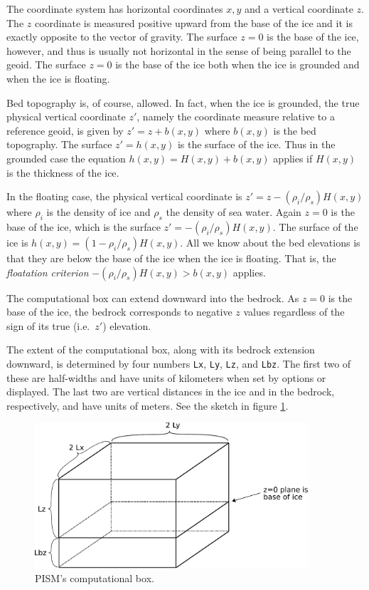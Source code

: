 \documentclass[11pt,final]{amsart}
\renewcommand{\t}[1]{\texttt{#1}}
\begin{document}
The coordinate system has horizontal coordinates $x,y$ and a vertical coordinate $z$.  The $z$ coordinate is measured positive upward from the base of the ice and it is exactly opposite to the vector of gravity.  The surface $z=0$ is the base of the ice, however, and thus is usually not horizontal in the sense of being parallel to the geoid.   The surface $z=0$ is the base of the ice both when the ice is grounded and when the ice is floating.

Bed topography is, of course, allowed.  In fact, when the ice is grounded, the true physical vertical coordinate $z'$, namely the coordinate measure relative to a reference geoid, is given by $z'=z+b(x,y)$ where $b(x,y)$ is the bed topography.  The surface $z'=h(x,y)$ is the surface of the ice.  Thus in the grounded case the equation $h(x,y)=H(x,y)+b(x,y)$ applies if $H(x,y)$ is the thickness of the ice.

In the floating case, the physical vertical coordinate is $z'=z-(\rho_i/\rho_s) H(x,y)$ where $\rho_i$ is the density of ice and $\rho_s$ the density of sea water.  Again $z=0$ is the base of the ice, which is the surface $z' = -(\rho_i/\rho_s) H(x,y)$.  The surface of the ice is $h(x,y) = (1-\rho_i/\rho_s) H(x,y)$.  All we know about the bed elevations is that they are below the base of the ice when the ice is floating.  That is, the \emph{floatation criterion} $-(\rho_i/\rho_s) H(x,y) > b(x,y)$ applies.

The computational box can extend downward into the bedrock.  As $z=0$ is the base of the ice, the bedrock corresponds to negative $z$ values regardless of the sign of its true (i.e.~$z'$) elevation.

The extent of the computational box, along with its bedrock extension downward, is determined by four numbers \t{Lx}, \t{Ly}, \t{Lz}, and \t{Lbz}.  The first two of these are half-widths and have units of kilometers when set by options or displayed.  The last two are vertical distances in the ice and in the bedrock, respectively, and have units of meters.  See the sketch in figure \ref{fig:rectilinearbox}.

\begin{figure}[ht]
\includegraphics[width=4.0in,keepaspectratio=true]{figs/rectilinearbox}
\caption{PISM's computational box.}
\label{fig:rectilinearbox}
\end{figure}
\end{document}
